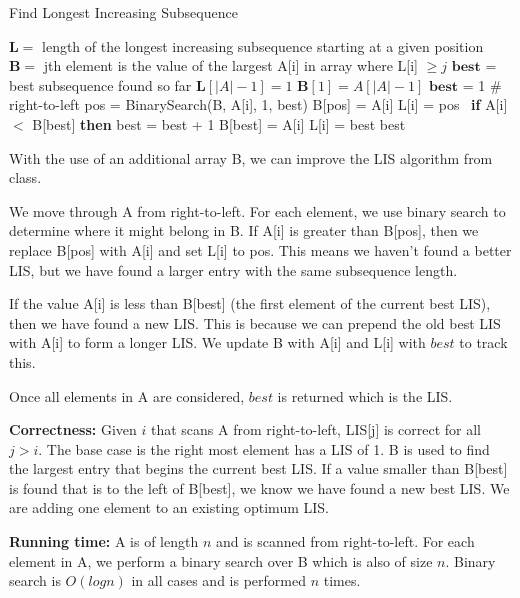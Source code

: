 \documentclass[11pt]{article}
\newcommand\correctness{\vspace{.10in}\textbf{Correctness: }}
\newcommand\runtime{\vspace{.10in}\textbf{Running time: }}
\begin{document}
\begin{algorithm}[H]
\caption{Find Longest Increasing Subsequence}
\label{CHalgorithm}
\begin{algorithmic}[1]
\Variables
\State $\mathbf{L} = $ length of the longest increasing subsequence starting at a given position
\State $\mathbf{B} =$ jth element is the value of the largest A[i] in array where L[i] $\geq j$
\State $\mathbf{best}$ = best subsequence found so far
\State
\State $\mathbf{L}[|A|-1] = 1$ 
\State $\mathbf{B}[1] = A[|A| - 1]$
\State $\mathbf{best}$ = 1
\EndVariables
\State
{}
 \# right-to-left
	\State pos = BinarySearch(B, A[i], 1, best)
		\State B[pos] = A[i]
		\State L[i] = pos
	\Else \ \textbf{if} {A[i] $<$ B[best]} \textbf{then}
		\State best = best + 1
		\State B[best] = A[i]
		\State L[i] = best
	\EndIf
\EndFor
\State
\State \Return best
\EndProcedure
\end{algorithmic}
\end{algorithm}

With the use of an additional array B, we can improve the LIS algorithm from class.

We move through A from right-to-left. For each element, we use binary search to determine where it might belong in B. If A[i] is greater than B[pos], then we replace B[pos] with A[i] and set L[i] to pos. This means we haven't found a better LIS, but we have found a larger entry with the same subsequence length.

 If the value A[i] is less than B[best] (the first element of the current best LIS), then we have found a new LIS. This is because we can prepend the old best LIS with A[i] to form a longer LIS. We update B with A[i] and L[i] with $best$ to track this.
 
 Once all elements in A are considered, $best$ is returned which is the LIS.

\correctness Given $i$ that scans A from right-to-left, LIS[j] is correct for all $j > i$. The base case is the right most element has a LIS of 1. B is used to find the largest entry that begins the current best LIS. If a value smaller than B[best] is found that is to the left of B[best], we know we have found a new best LIS. We are adding one element to an existing optimum LIS.

\runtime A is of length $n$ and is scanned from right-to-left. For each element in A, we perform a binary search over B which is also of size $n$. Binary search is $O(log n)$ in all cases and is performed $n$ times.
\end{document}

